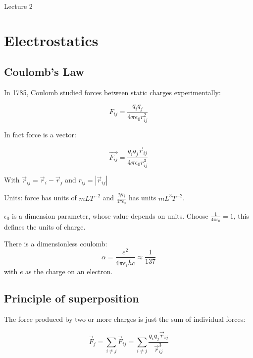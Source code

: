 \begin{center}

Lecture 2

\end{center}

\section{Electrostatics}

\subsection{Coulomb's Law}

In 1785, Coulomb studied forces between static charges experimentally:

\begin{equation}
F_{ij} = \frac{q_i q_j}{4 \pi \epsilon_0 r_{ij}^2}
\end{equation}

In fact force is a vector:

\begin{equation}
\vec{F_{ij}} = \frac{q_i q_j \vec{r}_{ij}}{4 \pi \epsilon_0 r_{ij}^3}
\end{equation}

With $\vec{r}_{ij} = \vec{r}_i - \vec{r}_j$ and $r_{ij} = | \vec{r}_{ij} | $

Units: force has units of $m L T^{-2}$ and $\frac{q_i q_j}{4 \pi \epsilon_0}$ has units $m L^3 T^{-2}$.

\vspace{\baselineskip}

$\epsilon_0$ is a dimension parameter, whose value depends on units. Choose $\frac{1}{4\pi\epsilon_0} = 1$, this defines the units of charge.

There is a dimensionless coulomb: $$\alpha = \frac{e^2}{4 \pi \epsilon_i \bar{h} c} \approx \frac{1}{137}$$ with $e$ as the charge on an electron.

\subsection{Principle of superposition}

The force produced by two or more charges is just the sum of individual forces: 

\begin{equation}
\vec{F}_j = \sum_{i\neq j} \vec{F}_{ij} = \sum_{i \neq j} \frac{q_i q_j \vec{r}_{ij}}{\vec{r}^3_{ij}}
\end{equation}

